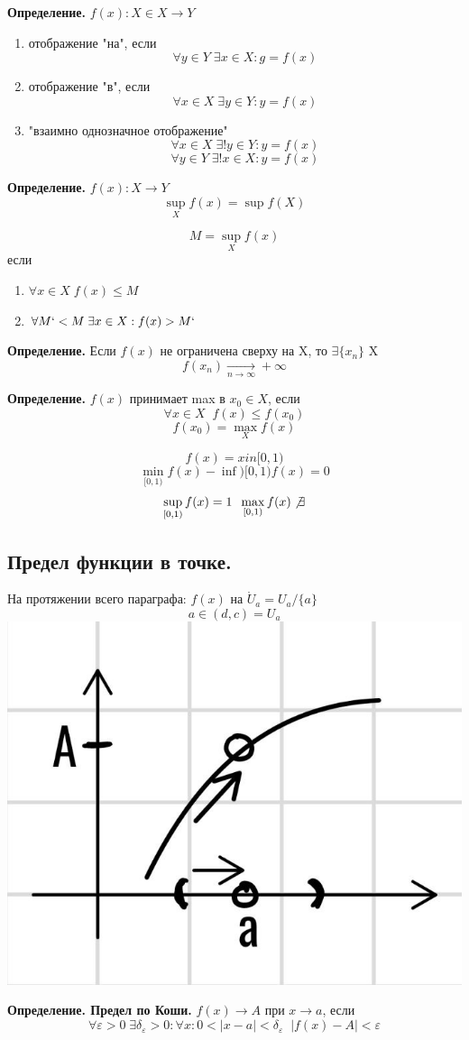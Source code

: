 \documentclass[12pt, paper]{article}
\newcommand{\eps}{\varepsilon}
\begin{document}
\begin{tcolorbox}
	\textbf{Определение.} $f(x): X \in X \to Y$
	\begin{enumerate}
		\item отображение "на", если
			\[ \forall y \in Y\; \exists x \in X: g = f(x) \]
		\item отображение "в", если
			\[ \forall x \in X\; \exists y \in Y: y = f(x) \]
		\item "взаимно однозначное отображение"
			\[ \forall x \in X\; \exists! y \in Y: y = f(x) \]
			\[ \forall y \in Y\; \exists! x \in X: y = f(x) \]
	\end{enumerate}
\end{tcolorbox}

\begin{tcolorbox}
	\textbf{Определение.} $f(x): X \to Y$
	\[ \sup_X f(x)=\sup f(X) \]
\end{tcolorbox}
\[ M = \sup_X f(x) \]
если 
\begin{enumerate}
	\item $\forall x \in X\; f(x) \leq M $
	\item $\forall M` < M\; \exists x \in X: f(x) > M` $
\end{enumerate}

\begin{tcolorbox}
	\textbf{Определение.} Если $f(x)$ не ограничена сверху на X, то $\exists \{ x_n \}$ \supset X 
	\[ f(x_n) \xrightarrow[n\to\infty]{} +\infty \]
\end{tcolorbox}

\begin{tcolorbox}
	\textbf{Определение.} $f(x)$ принимает max в $x_0 \in X$, если
	\[ \forall x \in X\;\; f(x) \leq f(x_0) \]
	\[ f(x_0) = \max_X f(x) \]
\end{tcolorbox}

\[ f(x) = x in [0, 1) \]
\[ \min_{[0,1)} f(x) - \inf){[0, 1)} f(x) = 0\]
\[ \sup_{[0,1)} f(x) =1\;\; \max_{[0,1)} f(x) \not \exists \]

\subsection{Предел функции в точке.}

На протяжении всего параграфа: $f(x)$ на $\mathring U_a = U_a / \{a\}$
\[ a \in (d, c) = U_a \]
\includegraphics[width=0.5\linewidth]{images/Функции/Предел функции в точке/График.jpg}
\begin{tcolorbox}
	\textbf{Определение. Предел по Коши. } $f(x) \to A$ при $x \to a$, если 
	\[ \forall \eps > 0\; \exists \delta_\eps > 0: \forall x: 0<|x-a| < \delta_\eps\;\; |f(x) - A| < \eps \]
\end{tcolorbox}
\end{document}
